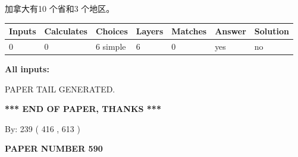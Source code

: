 \documentclass{ctexart}
\begin{document}
 
加拿大有10 个省和3 个地区。
 
 
\noindent{}
 
 
   
   
   
   
\noindent\begin{tabular}{|l|l|l|l|l|l|l|}
 \hline
Inputs & Calculates & Choices & Layers & Matches & Answer & Solution \\ \hline
 0  & 
 0  & 
 6
  simple  
  & 
 6  & 
 0  & 
  yes & 
  no 
  \\ \hline
 \end{tabular}
   
   
   
   
\noindent{}
   
   
   
   
\noindent\vspace{0.1in}\hspace{-0.08in} {\textbf{\Large{All inputs: }}}
   
   
   
   
   
   
 \vspace{0.2in}
 
   
   
\vspace{2.0in} PAPER TAIL GENERATED.
   
   
   
   
\vspace{1.0in} 
{\textbf{\large{ *** END OF PAPER, THANKS *** }}} 
   
   
\hspace{1.0in} By: 
 239 ( 416 ,  613 )
   
   
   
   
\newpage 
\setcounter{page}{ 
   590001 } 
   
   
   
   
 {\textbf{ \Large{ PAPER NUMBER  590  }}}
   
   
\vspace{0.2in}
   
   
   
   
   
   
   
\end{document}
